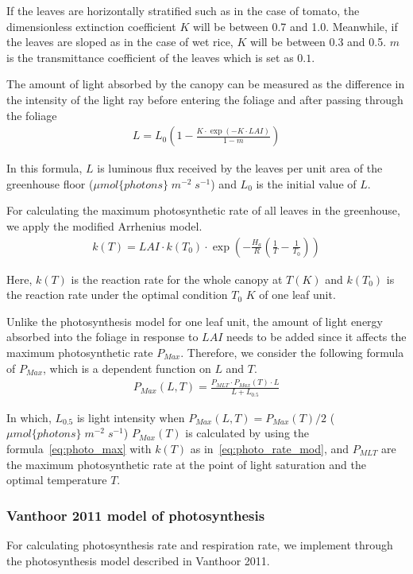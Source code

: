 \documentclass[a4paper]{article}
\begin{document}
If the leaves are horizontally stratified such as in the case of tomato, the dimensionless extinction coefficient \(K\) will be between 0.7 and 1.0. Meanwhile, if the leaves are sloped as in the case of wet rice, \(K\) will be between 0.3 and 0.5. \(m\) is the transmittance coefficient of the leaves which is set as \(0.1\).

The amount of light absorbed by the canopy can be measured as the difference in the intensity of the light ray before entering the foliage and after passing through the foliage
\begin{align}
  L =L_0 \left(1 - \frac{K \cdot \exp \left(-K \cdot LAI\right)}{1 - m}\right)
\end{align}

In this formula, \(L\) is luminous flux received by the leaves per unit area of the greenhouse floor (\(\mu mol\{photons\}\;m^{-2}\;s^{-1}\)) and \(L_0\) is the initial value of \(L\).

For calculating the maximum photosynthetic rate of all leaves in the greenhouse, we apply the modified Arrhenius model.
\begin{align}
  \label{eq:photo_rate_mod}
  k(T) = LAI \cdot k(T_0) \cdot \exp \left(-\frac{H_a}{R} \left(\frac{1}{T} - \frac{1}{T_0}\right)\right)
\end{align}

Here, \(k(T)\) is the reaction rate for the whole canopy at \(T(K)\) and \(k(T_0)\) is the reaction rate under the optimal condition \(T_0\) \(K\) of one leaf unit.

Unlike the photosynthesis model for one leaf unit, the amount of light energy absorbed into the foliage in response to \(LAI\) needs to be added since it affects the maximum photosynthetic rate \(P_{Max}\). Therefore, we consider the following formula of \(P_{Max}\), which is a dependent function on \(L\) and \(T\).
\begin{align}
  P_{Max} (L,T) = \frac{P_{MLT} \cdot P_{Max}(T) \cdot L}{L + L_{0.5}}
\end{align}

In which, \(L_{0.5}\) is light intensity when \(P_{Max} (L,T) = P_{Max}(T)/2\) (\(\mu mol\{photons\}\;m^{-2}\;s^{-1}\))
\(P_{Max}(T)\) is calculated by using the formula~\eqref{eq:photo_max} with \(k(T)\) as in~\eqref{eq:photo_rate_mod}, and \(P_{MLT}\) are the maximum
photosynthetic rate at the point of light saturation and the optimal temperature \(T\).

\subsubsection{Vanthoor 2011 model of photosynthesis}
For calculating photosynthesis rate and respiration rate, we implement through the photosynthesis model described in Vanthoor 2011.
\end{document}
